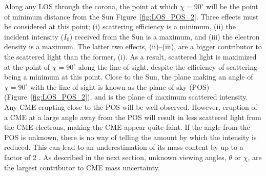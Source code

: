 Along any LOS through the corona, the point at which $\chi = 90^{\circ}$ will be the point of minimum distance from the Sun Figure~\ref{fig:LOS_POS_2}. Three effects must be considered at this point; (i) scattering efficiency is a minimum, (ii) the incident intensity ($I_0$) received from the Sun is a maximum, and (iii) the electron density is a maximum. The latter two effects, (ii)--(iii), are a bigger contributor to the scattered light than the former, (i). As a result, scattered light is maximized at the point of $\chi = 90^{\circ}$ along the line of sight, despite the efficiency of scattering being a minimum at this point. Close to the Sun, the plane making an angle of $\chi = 90^{\circ}$ with the line of sight is known as the plane-of-sky (POS) (Figure~\ref{fig:LOS_POS_2}), and is the plane of maximum scattered intensity. Any CME erupting close to the POS will be well observed. However, eruption of a CME at a large angle away from the POS will result in less scattered light from the CME electrons, making the CME appear quite faint. If the angle from the POS is unknown, there is no way of telling the amount by which the intensity is reduced. 
This can lead to an underestimation of its mass content by up to a factor of 2 \citep{vou00}. As described in the next section, unknown viewing angles, $\theta$ or $\chi$, are the largest contributor to CME mass uncertainty.


